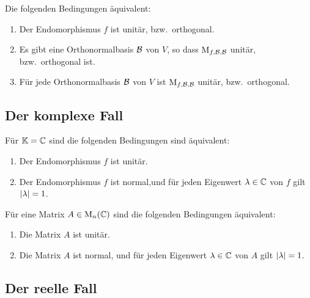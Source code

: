 \begin{lemma}
  Die folgenden Bedingungen äquivalent:
  \begin{enumerate}
    \item
      Der Endomorphismus $f$ ist unitär, bzw.\ orthogonal.
    \item
      Es gibt eine Orthonormalbasis $\mathcal{B}$ von $V$, so dass $\operatorname{M}_{f, \mathcal{B}, \mathcal{B}}$ unitär, bzw.\ orthogonal ist.
    \item
      Für jede Orthonormalbasis $\mathcal{B}$ von $V$ ist $\operatorname{M}_{f, \mathcal{B}, \mathcal{B}}$ unitär, bzw.\ orthogonal.
  \end{enumerate}
\end{lemma}



\subsection{Der komplexe Fall}

\begin{theorem}
  Für $\mathbb{K} = \mathbb{C}$ sind die folgenden Bedingungen sind äquivalent:
  \begin{enumerate}
    \item
      Der Endomorphismus $f$ ist unitär.
    \item
      Der Endomorphismus $f$ ist normal,und für jeden Eigenwert $\lambda \in \mathbb{C}$ von $f$ gilt $\left| \lambda \right| = 1$.
  \end{enumerate}
\end{theorem}

\begin{corollary}
  Für eine Matrix $A \in \operatorname{M}_{n}(\mathbb{C})$ sind die folgenden Bedingungen äquivalent:
  \begin{enumerate}
    \item
      Die Matrix $A$ ist unitär.
    \item
      Die Matrix $A$ ist normal, und für jeden Eigenwert $\lambda \in \mathbb{C}$ von $A$ gilt $\left| \lambda \right| = 1$.
  \end{enumerate}
\end{corollary}



\subsection{Der reelle Fall}

